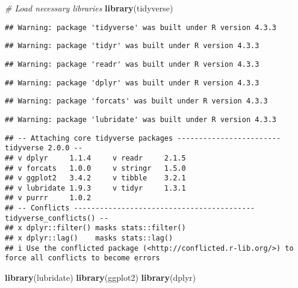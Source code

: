 \documentclass[
]{article}
\newenvironment{Shaded}{\begin{snugshade}}{\end{snugshade}}
\newcommand{\CommentTok}[1]{\textcolor[rgb]{0.56,0.35,0.01}{\textit{#1}}}
\newcommand{\FunctionTok}[1]{\textcolor[rgb]{0.13,0.29,0.53}{\textbf{#1}}}
\newcommand{\NormalTok}[1]{#1}
\begin{document}
\begin{Shaded}
\begin{Highlighting}[]
\CommentTok{\# Load necessary libraries}
\FunctionTok{library}\NormalTok{(tidyverse)}
\end{Highlighting}
\end{Shaded}

\begin{verbatim}
## Warning: package 'tidyverse' was built under R version 4.3.3
\end{verbatim}

\begin{verbatim}
## Warning: package 'tidyr' was built under R version 4.3.3
\end{verbatim}

\begin{verbatim}
## Warning: package 'readr' was built under R version 4.3.3
\end{verbatim}

\begin{verbatim}
## Warning: package 'dplyr' was built under R version 4.3.3
\end{verbatim}

\begin{verbatim}
## Warning: package 'forcats' was built under R version 4.3.3
\end{verbatim}

\begin{verbatim}
## Warning: package 'lubridate' was built under R version 4.3.3
\end{verbatim}

\begin{verbatim}
## -- Attaching core tidyverse packages ------------------------ tidyverse 2.0.0 --
## v dplyr     1.1.4     v readr     2.1.5
## v forcats   1.0.0     v stringr   1.5.0
## v ggplot2   3.4.2     v tibble    3.2.1
## v lubridate 1.9.3     v tidyr     1.3.1
## v purrr     1.0.2     
## -- Conflicts ------------------------------------------ tidyverse_conflicts() --
## x dplyr::filter() masks stats::filter()
## x dplyr::lag()    masks stats::lag()
## i Use the conflicted package (<http://conflicted.r-lib.org/>) to force all conflicts to become errors
\end{verbatim}

\begin{Shaded}
\begin{Highlighting}[]
\FunctionTok{library}\NormalTok{(lubridate)}
\FunctionTok{library}\NormalTok{(ggplot2)}
\FunctionTok{library}\NormalTok{(dplyr)}
\end{Highlighting}
\end{Shaded}
\end{document}
